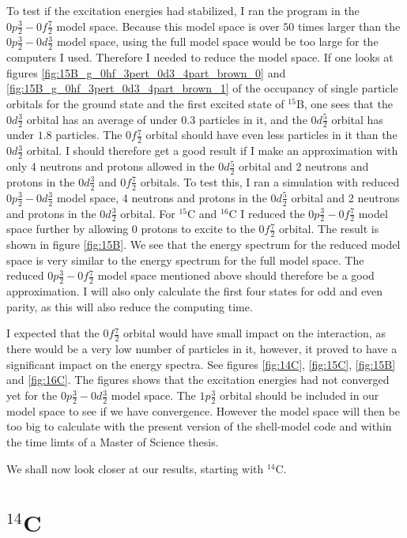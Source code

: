 To test if the excitation energies had stabilized, I ran the program in the
$0p\frac32-0f\frac72$ model space. Because this model space is over $50$ times
larger than the $0p\frac32-0d\frac32$ model space, using the full model space
would be too large for the computers I used. Therefore I needed to reduce the
model space. If one looks at figures
\ref{fig:15B_g_0hf_3pert_0d3_4part_brown_0} and
\ref{fig:15B_g_0hf_3pert_0d3_4part_brown_1} of the occupancy of single particle
orbitals for the ground state and the first excited state of $^{15}$B, one sees
that the $0d\frac32$ orbital has an average of under $0.3$ particles in it, and
the $0d\frac52$ orbital has under $1.8$ particles. The $0f\frac72$ orbital
should have even less particles in it than the $0d\frac32$ orbital. I should
therefore get a good result if I make an approximation with only 4 neutrons and
protons allowed in the $0d\frac52$ orbital and 2 neutrons and protons in the
$0d\frac32$ and $0f\frac72$ orbitals. To test this, I ran a simulation with
reduced $0p\frac32-0d\frac32$ model space, 4 neutrons and protons in the
$0d\frac52$ orbital and 2 neutrons and protons in the $0d\frac32$ orbital. For
$^{15}$C and $^{16}$C I reduced the $0p\frac32-0f\frac72$ model space further
by allowing 0 protons to excite to the $0f\frac72$ orbital. The result is shown
in figure \ref{fig:15B}. We see that the energy spectrum for the reduced model
space is very similar to the energy spectrum for the full model space. The
reduced $0p\frac32-0f\frac72$ model space mentioned above should therefore be a
good approximation. I will also only calculate the first four states for
odd and even parity, as this will also reduce the computing time.

I expected that the $0f\frac72$ orbital would have small impact on the
interaction, as there would be a very low number of particles in it, however,
it proved to have a significant impact on the energy spectra. See figures
\ref{fig:14C}, \ref{fig:15C}, \ref{fig:15B} and \ref{fig:16C}. The figures
shows that the excitation energies had not converged yet for the
$0p\frac32-0d\frac32$ model space. The $1p\frac32$ orbital should be included
in our model space to see if we have convergence. However the model space will
then be too big to calculate with the present version of the shell-model code and within the 
time limts of a Master of Science thesis.

We shall now look closer at our results, starting with $^{14}$C.

\section{$^{14}$C}

